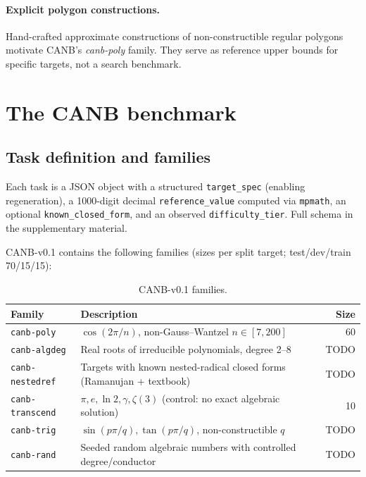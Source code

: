 \documentclass[11pt]{article}
\begin{document}
\paragraph{Explicit polygon constructions.} Hand-crafted approximate constructions of non-constructible regular polygons \cite{williamson55, goormaghtigh56, perkins05, spichal26, hogendijk84, benjamin14} motivate CANB's \textit{canb-poly} family. They serve as reference upper bounds for specific targets, not a search benchmark.

\section{The CANB benchmark}
\label{sec:benchmark}

\subsection{Task definition and families}

Each task is a JSON object with a structured \texttt{target\_spec} (enabling regeneration), a 1000-digit decimal \texttt{reference\_value} computed via \texttt{mpmath}, an optional \texttt{known\_closed\_form}, and an observed \texttt{difficulty\_tier}. Full schema in the supplementary material.

CANB-v0.1 contains the following families (sizes per split target; test/dev/train 70/15/15):

\begin{table}[t]
  \centering
  \caption{CANB-v0.1 families.}
  \label{tab:families}
  \begin{tabular}{llr}
    \toprule
    Family & Description & Size \\
    \midrule
    \texttt{canb-poly}      & $\cos(2\pi/n)$, non-Gauss--Wantzel $n \in [7, 200]$ & 60 \\
    \texttt{canb-algdeg}    & Real roots of irreducible polynomials, degree 2--8 & TODO \\
    \texttt{canb-nestedref} & Targets with known nested-radical closed forms (Ramanujan + textbook) & TODO \\
    \texttt{canb-transcend} & $\pi, e, \ln 2, \gamma, \zeta(3)$ (control: no exact algebraic solution) & 10 \\
    \texttt{canb-trig}      & $\sin(p\pi/q), \tan(p\pi/q)$, non-constructible $q$ & TODO \\
    \texttt{canb-rand}      & Seeded random algebraic numbers with controlled degree/conductor & TODO \\
    \bottomrule
  \end{tabular}
\end{table}
\end{document}
